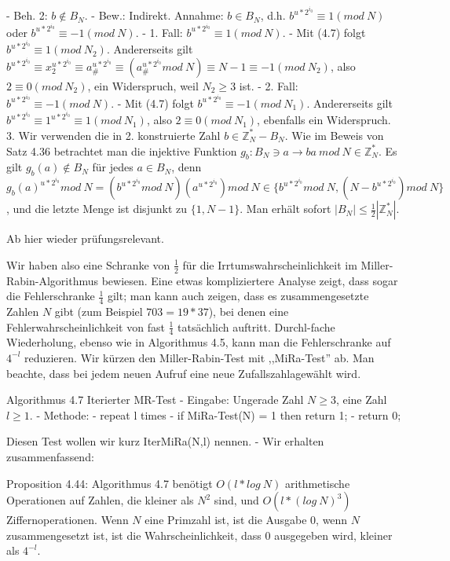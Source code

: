\documentclass[a4paper]{article}
\begin{document}
\begin{multicols}{3}
        - Beh. 2: $b\not\in B_N$.
        - Bew.: Indirekt. Annahme: $b\in B_N$, d.h. $b^{u*2^{i_0}} \equiv 1 (mod\ N)$ oder $b^{u*2^{i_0}} \equiv -1 (mod\ N)$.
        - 1. Fall: $b^{u*2^{i_0}} \equiv 1 (mod\ N)$. - Mit (4.7) folgt $b^{u*2^{i_0}} \equiv 1 (mod\ N_2)$. Andererseits gilt $b^{u*2^{i_0}} \equiv x^{u*2^{i_0}}_2 \equiv a^{u*2^{i_0}}_{\#}\equiv (a^{u*2^{i_0}}_{\#}mod\ N)\equiv N-1 \equiv -1 (mod\ N_2)$, also $2\equiv 0 (mod\ N_2)$, ein Widerspruch, weil $N_2 \geq 3$ ist.
        - 2. Fall: $b^{u*2^{i_0}} \equiv  -1 (mod\ N)$. - Mit (4.7) folgt $b^{u*2^{i_0}} \equiv -1(mod\ N_1)$. Andererseits gilt $b^{u*2^{i_0}} \equiv 1^{u*2^{i_0}} \equiv 1 (mod\ N_1)$, also $2\equiv 0 (mod\ N_1)$, ebenfalls ein Widerspruch.
        3. Wir verwenden die in 2. konstruierte Zahl $b\in\mathbb{Z}^*_N-B_N$. Wie im Beweis von Satz 4.36 betrachtet man die injektive Funktion $g_b:B_N \ni a\rightarrow ba\ mod\ N \in\mathbb{Z}^*_N$. Es gilt $g_b(a)\not\in B_N$ für jedes $a\in B_N$, denn $g_b(a)^{u*2^{i_0}} mod\ N= (b^{u*2^{i_0}} mod\ N)(a^{u*2^{i_0}}) mod\ N\in\{b^{u*2^{i_0}} mod\ N, (N-b^{u*2^{i_0}}) mod\ N\}$, und die letzte Menge ist disjunkt zu $\{1 ,N-1\}$. Man erhält sofort $|B_N|\leq \frac{1}{2} | \mathbb{Z}^*_N|$.

        Ab hier wieder prüfungsrelevant.

        Wir haben also eine Schranke von $\frac{1}{2}$ für die Irrtumswahrscheinlichkeit im Miller-Rabin-Algorithmus bewiesen. Eine etwas kompliziertere Analyse zeigt, dass sogar die Fehlerschranke $\frac{1}{4}$ gilt; man kann auch zeigen, dass es zusammengesetzte Zahlen $N$ gibt (zum Beispiel $703 = 19*37$), bei denen eine Fehlerwahrscheinlichkeit von fast $\frac{1}{4}$ tatsächlich auftritt. Durchl-fache Wiederholung, ebenso wie in Algorithmus 4.5, kann man die Fehlerschranke auf $4^{-l}$ reduzieren. Wir kürzen den Miller-Rabin-Test mit ,,MiRa-Test'' ab. Man beachte, dass bei jedem neuen Aufruf eine neue Zufallszahlagewählt wird.

        Algorithmus 4.7 Iterierter MR-Test
        - Eingabe: Ungerade Zahl $N\geq 3$, eine Zahl $l\geq 1$.
        - Methode:
        - repeat l times
        - if MiRa-Test(N) = 1 then return 1;
        - return 0;

        Diesen Test wollen wir kurz IterMiRa(N,l) nennen. - Wir erhalten zusammenfassend:

        Proposition 4.44: Algorithmus 4.7 benötigt $O(l*log\ N)$ arithmetische Operationen auf Zahlen, die kleiner als $N^2$ sind, und $O(l*(log\ N)^3)$ Ziffernoperationen. Wenn $N$ eine Primzahl ist, ist die Ausgabe $0$, wenn $N$ zusammengesetzt ist, ist die Wahrscheinlichkeit, dass $0$ ausgegeben wird, kleiner als $4^{-l}$.


\end{multicols}
\end{document}
